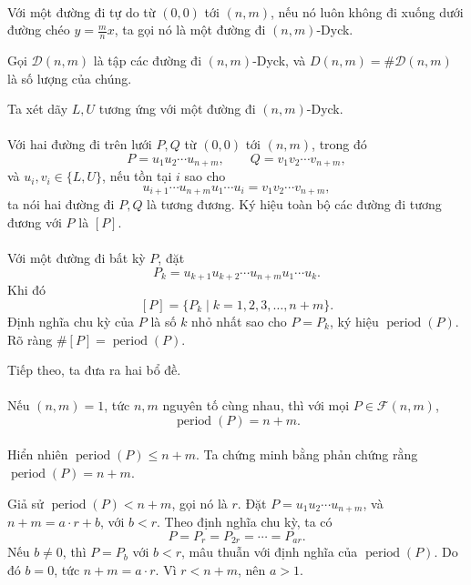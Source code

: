 \documentclass[11pt]{article}
\begin{document}
\paragraph{}
Với một đường đi tự do từ \((0,0)\) tới \((n,m)\), nếu nó luôn không đi xuống
dưới đường chéo \(y=\frac mn x\), ta gọi nó là một đường đi \((n,m)\)-Dyck.

Gọi \(\mathcal D(n,m)\) là tập các đường đi \((n,m)\)-Dyck, và
\(D(n,m)=\#\mathcal D(n,m)\) là số lượng của chúng.

Ta xét dãy \(L,U\) tương ứng với một đường đi \((n,m)\)-Dyck.

\paragraph{}
Với hai đường đi trên lưới \(P,Q\) từ \((0,0)\) tới \((n,m)\), trong đó
\[
  P=u_1u_2\cdots u_{n+m},\qquad
  Q=v_1v_2\cdots v_{n+m},
\]
và \(u_i,v_i\in\{L,U\}\), nếu tồn tại \(i\) sao cho
\[
  u_{i+1}\cdots u_{n+m}u_1\cdots u_i=v_1v_2\cdots v_{n+m},
\]
ta nói hai đường đi \(P,Q\) là tương đương. Ký hiệu toàn bộ các đường đi tương
đương với \(P\) là \([P]\).

\paragraph{}
Với một đường đi bất kỳ \(P\), đặt
\[
  P_k=u_{k+1}u_{k+2}\cdots u_{n+m}u_1\cdots u_k.
\]
Khi đó
\[
  [P]=\{P_k\mid k=1,2,3,\ldots,n+m\}.
\]
Định nghĩa chu kỳ của \(P\) là số \(k\) nhỏ nhất sao cho \(P=P_k\), ký hiệu
\(\operatorname{period}(P)\). Rõ ràng
\(\#[P]=\operatorname{period}(P)\).

Tiếp theo, ta đưa ra hai bổ đề.

\paragraph{}
Nếu \((n,m)=1\), tức \(n,m\) nguyên tố cùng nhau, thì với mọi
\(P\in\mathcal F(n,m)\),
\[
  \operatorname{period}(P)=n+m. \tag{4}
\]

\paragraph{}
Hiển nhiên \(\operatorname{period}(P)\le n+m\). Ta chứng minh bằng phản chứng
rằng \(\operatorname{period}(P)=n+m\).

Giả sử \(\operatorname{period}(P)<n+m\), gọi nó là \(r\). Đặt
\(P=u_1u_2\cdots u_{n+m}\), và \(n+m=a\cdot r+b\), với \(b<r\). Theo định
nghĩa chu kỳ, ta có
\[
  P=P_r=P_{2r}=\cdots=P_{ar}.
\]
Nếu \(b\ne0\), thì \(P=P_b\) với \(b<r\), mâu thuẫn với định nghĩa của
\(\operatorname{period}(P)\). Do đó \(b=0\), tức \(n+m=a\cdot r\). Vì
\(r<n+m\), nên \(a>1\).
\end{document}
